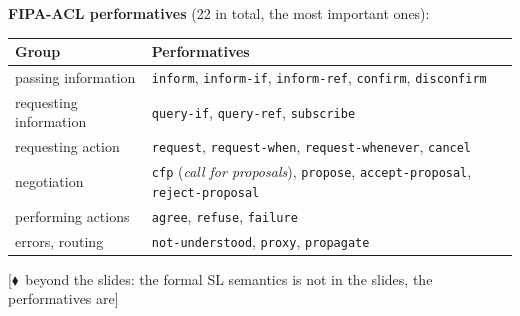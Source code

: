 \documentclass[11pt,a4paper]{article}
\theoremstyle{definition}
\newcommand{\mimoq}[1]{\textcolor{markcol}{\textsf{\footnotesize[$\blacklozenge$~beyond the slides: #1]}}}
\begin{document}
\textbf{FIPA-ACL performatives} (22 in total, the most important ones):
\begin{center}\small
\begin{tabular}{p{} p{}}
\toprule
\textbf{Group} & \textbf{Performatives} \\
\midrule
passing information & \texttt{inform}, \texttt{inform-if}, \texttt{inform-ref},
  \texttt{confirm}, \texttt{disconfirm} \\
requesting information & \texttt{query-if}, \texttt{query-ref}, \texttt{subscribe} \\
requesting action & \texttt{request}, \texttt{request-when}, \texttt{request-whenever},
  \texttt{cancel} \\
negotiation & \texttt{cfp} (\emph{call for proposals}), \texttt{propose},
  \texttt{accept-proposal}, \texttt{reject-proposal} \\
performing actions & \texttt{agree}, \texttt{refuse}, \texttt{failure} \\
errors, routing & \texttt{not-understood}, \texttt{proxy}, \texttt{propagate} \\
\bottomrule
\end{tabular}
\end{center}

\noindent\mimoq{the formal SL semantics is not in the slides, the performatives are}
\end{document}
